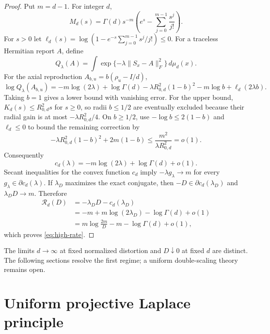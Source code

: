 \documentclass[11pt,a4paper]{article}
\theoremstyle{remark}
\newcommand{\cR}{\mathcal{R}}
\begin{document}
\begin{proof}
Put $m=d-1$.  For integer $d$,
\begin{equation}
 M_d(s)=\Gamma(d)s^{-m}
 \left(e^s-\sum_{j=0}^{m-1}\frac{s^j}{j!}\right).
 \label{eq:M-integer}
\end{equation}
For $s>0$ let
$\ell_d(s)=\log(1-e^{-s}\sum_{j=0}^{m-1}s^j/j!)\le0$.
For a traceless Hermitian report $A$, define
\begin{equation}
 Q_\lambda(A)=\int
 \exp\{-\lambda\|S_x-A\|_F^2\}\,d\mu_d(x).
 \label{eq:high-rate-partition}
\end{equation}
For the axial reproduction $A_{b,u}=b(\rho_u-I/d)$,
\begin{equation}
 \log Q_\lambda(A_{b,u})=
 -m\log(2\lambda)+\log\Gamma(d)
 -\lambda R_{0,d}^2(1-b)^2-m\log b+\ell_d(2\lambda b).
 \label{eq:high-rate-identity}
\end{equation}
Taking $b=1$ gives a lower bound with vanishing error.  For the upper bound,
$K_d(s)\le R_{0,d}^2s$ for $s\ge0$, so radii $b\le1/2$ are eventually
excluded because their radial gain is at most
$-\lambda R_{0,d}^2/4$.  On $b\ge1/2$, use $-\log b\le2(1-b)$ and
$\ell_d\le0$ to bound the remaining correction by
\begin{equation}
 -\lambda R_{0,d}^2(1-b)^2+2m(1-b)
 \le\frac{m^2}{\lambda R_{0,d}^2}=o(1).
\end{equation}
Consequently
\begin{equation}
 c_d(\lambda)=-m\log(2\lambda)+\log\Gamma(d)+o(1).
 \label{eq:cd-high-rate}
\end{equation}
Secant inequalities for the convex function $c_d$ imply
$-\lambda g_\lambda\to m$ for every
$g_\lambda\in\partial c_d(\lambda)$.  If $\lambda_D$ maximizes the exact
conjugate, then $-D\in\partial c_d(\lambda_D)$ and
$\lambda_DD\to m$.  Therefore
\begin{align}
 \cR_d(D)
 &=-\lambda_DD-c_d(\lambda_D)\\
 &=-m+m\log(2\lambda_D)-\log\Gamma(d)+o(1)\\
 &=m\log\frac{2m}{D}-m-\log\Gamma(d)+o(1),
\end{align}
which proves \eqref{eq:high-rate}.
\end{proof}

The limits $d\to\infty$ at fixed normalized distortion and
$D\downarrow0$ at fixed $d$ are distinct.  The following sections resolve the
first regime; a uniform double-scaling theory remains open.

\section{Uniform projective Laplace principle}
\end{document}
